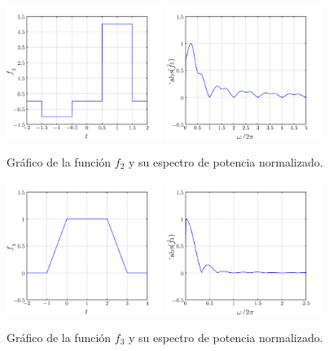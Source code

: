 \documentclass[a4paper,12pt,final]{article}
\begin{document}
      \begin{figure}[H]
        \caption{Gráfico de la función $f_2$ y su espectro de potencia normalizado.}
        \label{script01Bfigure}
        \begin{center}
          \includegraphics[width=0.45\textwidth]{./laboratorio_4/problema01_f2.png}
          \includegraphics[width=0.45\textwidth]{./laboratorio_4/problema01_F2.png}
        \end{center}
      \end{figure}

      \begin{figure}[H]
        \caption{Gráfico de la función $f_3$ y su espectro de potencia normalizado.}
        \label{script01Cfigure}
        \begin{center}
          \includegraphics[width=0.45\textwidth]{./laboratorio_4/problema01_f3.png}
          \includegraphics[width=0.45\textwidth]{./laboratorio_4/problema01_F3.png}
        \end{center}
      \end{figure}
\end{document}
